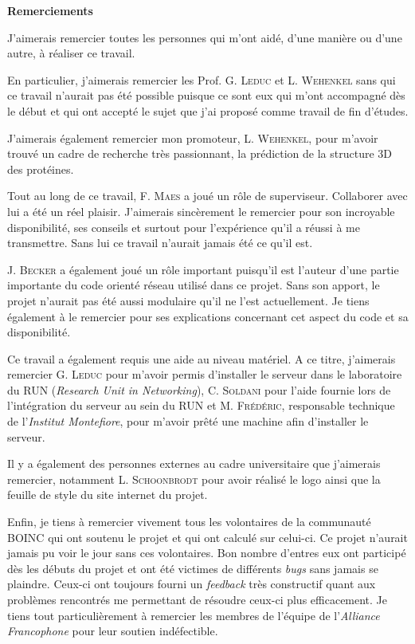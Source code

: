 \documentclass[a4paper, 12pt]{report}
\makeatletter
\newcommand\ackname{Remerciements}
\newenvironment{acknowledgements}{%
      \titlepage
      \null\vfil
      \@beginparpenalty\@lowpenalty
      \begin{center}%
        \bfseries \ackname
        \@endparpenalty\@M
      \end{center}}%
     {\par\vfil\null\endtitlepage}
\newenvironment{acknowledgements}{%
      \if@twocolumn
        \section*{\abstractname}%
      \else
        \small
        \begin{center}%
          {\bfseries \ackname\vspace{-.5em}\vspace{\z@}}%
        \end{center}%
        \quotation
      \fi}
      {\if@twocolumn\else\endquotation\fi}
\makeatother
\begin{document}
\newpage

\begin{acknowledgements}

J'aimerais remercier toutes les personnes qui m'ont aidé, d'une manière ou d'une autre, à réaliser ce travail.

En particulier, j'aimerais remercier les Prof. G. \textsc{Leduc} et L. \textsc{Wehenkel} sans qui ce travail n'aurait pas été possible puisque ce sont eux qui m'ont accompagné dès le début et qui ont accepté le sujet que j'ai proposé comme travail de fin d'études.

J'aimerais également remercier mon promoteur, L. \textsc{Wehenkel}, pour m'avoir trouvé un cadre de recherche très passionnant, la prédiction de la structure 3D des protéines.

Tout au long de ce travail, F. \textsc{Maes} a joué un rôle de superviseur. Collaborer avec lui a été un réel plaisir. J'aimerais sincèrement le remercier pour son incroyable disponibilité, ses conseils et surtout pour l'expérience qu'il a réussi à me transmettre. Sans lui ce travail n'aurait jamais été ce qu'il est.

J. \textsc{Becker} a également joué un rôle important puisqu'il est l'auteur d'une partie importante du code orienté réseau utilisé dans ce projet. Sans son apport, le projet n'aurait pas été aussi modulaire qu'il ne l'est actuellement. Je tiens également à le remercier pour ses explications concernant cet aspect du code et sa disponibilité.

Ce travail a également requis une aide au niveau matériel. A ce titre, j'aimerais remercier G. \textsc{Leduc} pour m'avoir permis d'installer le serveur dans le laboratoire du RUN (\textit{Research Unit in Networking}), C. \textsc{Soldani} pour l'aide fournie lors de l'intégration du serveur au sein du RUN et M. \textsc{Frédéric}, responsable technique de l'\textit{Institut Montefiore}, pour m'avoir prêté une machine afin d'installer le serveur.

Il y a également des personnes externes au cadre universitaire que j'aimerais remercier, notamment L. \textsc{Schoonbrodt} pour avoir réalisé le logo ainsi que la feuille de style du site internet du projet. 

Enfin, je tiens à remercier vivement tous les volontaires de la communauté \textsc{BOINC} qui ont soutenu le projet et qui ont calculé sur celui-ci. Ce projet n'aurait jamais pu voir le jour sans ces volontaires. Bon nombre d'entres eux ont participé dès les débuts du projet et ont été victimes de différents \textit{bugs} sans jamais se plaindre. Ceux-ci ont toujours fourni un \textit{feedback} très constructif quant aux problèmes rencontrés me permettant de résoudre ceux-ci plus efficacement. Je tiens tout particulièrement à remercier les membres de l'équipe de l'\textit{Alliance Francophone} pour leur soutien indéfectible.



\end{acknowledgements}
\end{document}
